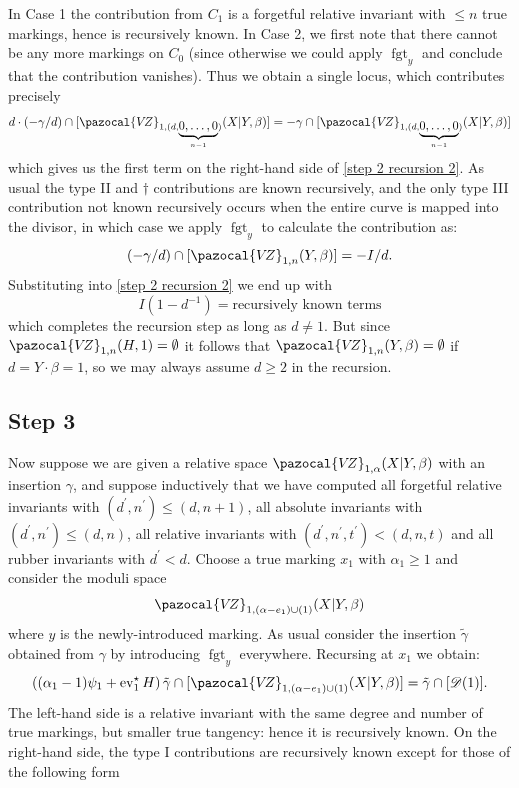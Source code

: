 \documentclass[11pt]{amsart}
\newcommand{\VZ}{\pazocal{V\!Z}}
\newcommand{\st}{\star}
\newcommand{\ev}{\operatorname{ev}}
\newcommand{\fgt}{\operatorname{fgt}}
\newcommand{\Dcal}{\mathcal{D}}
\theoremstyle{definition}
\theoremstyle{definition}
\begin{document}
In Case 1 the contribution from $C_1$ is a forgetful relative invariant with $\leq n$ true markings, hence is recursively known. In Case 2, we first note that there cannot be any more markings on $C_0$ (since otherwise we could apply $\fgt_y$ and conclude that the contribution vanishes). Thus we obtain a single locus, which contributes precisely
\begin{equation*} d\cdot(-\gamma/d) \cap [\VZ_{1,(d,\underbrace{0,\ldots,0}_{n-1})}(X|Y,\beta)] = -\gamma\cap[\VZ_{1,(d,\underbrace{0,\ldots,0}_{n-1})}(X|Y,\beta)]\end{equation*}
which gives us the first term on the right-hand side of \eqref{step 2 recursion 2}. As usual the type II and $\dag$ contributions are known recursively, and the only type III contribution not known recursively occurs when the entire curve is mapped into the divisor, in which case we apply $\fgt_y$ to calculate the contribution as:
\begin{equation*} (-\gamma/d) \cap [\VZ_{1,n}(Y,\beta)] = -I/d.\end{equation*}
Substituting into \eqref{step 2 recursion 2} we end up with
\begin{equation*} I(1-d^{-1}) = \text{recursively known terms} \end{equation*}
which completes the recursion step as long as $d \neq 1$. But since $\VZ_{1,n}(H,1)=\emptyset$ it follows that $\VZ_{1,n}(Y,\beta)=\emptyset$ if $d=Y\cdot\beta=1$, so we may always assume $d \geq 2$ in the recursion.

\subsection*{Step 3} Now suppose we are given a relative space $\VZ_{1,\alpha}(X|Y,\beta)$ with an insertion $\gamma$, and suppose inductively that we have computed all forgetful relative invariants with $(d^\prime,n^\prime) \leq (d,n+1)$, all absolute invariants with $(d^\prime,n^\prime) \leq (d,n)$, all relative invariants with $(d^\prime,n^\prime,t^\prime)<(d,n,t)$ and all rubber invariants with $d^\prime < d$. Choose a true marking $x_1$ with $\alpha_1 \geq 1$ and consider the moduli space
\begin{equation*} \VZ_{1,(\alpha-e_1)\cup(1)}(X|Y,\beta) \end{equation*}
where $y$ is the newly-introduced marking. As usual consider the insertion $\tilde\gamma$ obtained from $\gamma$ by introducing $\fgt_y$ everywhere. Recursing at $x_1$ we obtain:
\begin{equation*} \left( (\alpha_1-1)\psi_1 + \ev_1^\st H\right) \tilde\gamma \cap [\VZ_{1,(\alpha-e_1)\cup(1)}(X|Y,\beta)] = \tilde\gamma \cap [\Dcal(1)].\end{equation*}
The left-hand side is a relative invariant with the same degree and number of true markings, but smaller true tangency: hence it is recursively known. On the right-hand side, the type I contributions are recursively known except for those of the following form
\end{document}
